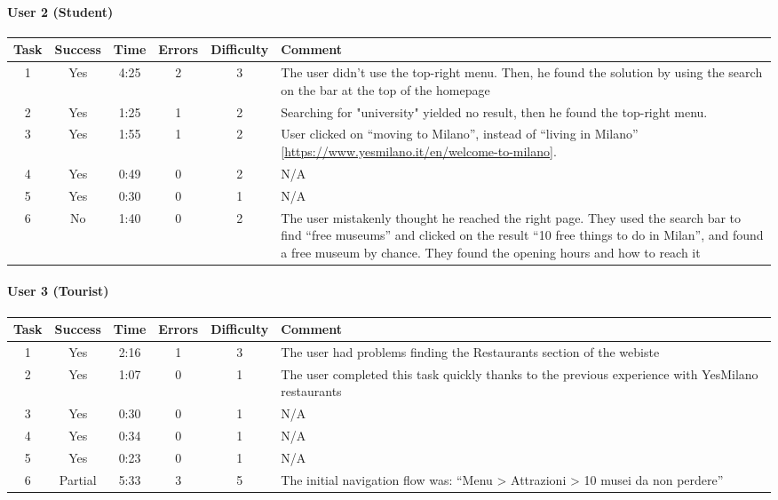 \begin{small}
\paragraph{User 2 (Student)}
\begin{tabularx}{\linewidth}{c c c c c X}
    \toprule
    \textbf{Task} & \textbf{Success} & \textbf{Time}
     & \textbf{Errors} & \textbf{Difficulty} & \textbf{Comment} \\
    \midrule
    1 & Yes & 4:25 & 2 & 3 & The user didn't use the top-right menu. Then, he found the solution by using the search on the bar at the top of the homepage \\ \midrule
    2 & Yes & 1:25 & 1 & 2 & Searching for "university" yielded no result, then he found the top-right menu. \\ \midrule
    3 & Yes & 1:55 & 1 & 2 & User clicked on ``moving to Milano'', instead of ``living in Milano'' [\href{https://www.yesmilano.it/en/welcome-to-milano}{https://www.yesmilano.it/en/welcome-to-milano}]. \\ \midrule
    4 & Yes & 0:49 & 0 & 2 & N/A \\ \midrule
    5 & Yes & 0:30 & 0 & 1 & N/A \\ \midrule
    6 & No & 1:40 & 0 & 2 & The user mistakenly thought he reached the right page. They used the search bar to find ``free museums'' and clicked on the result ``10 free things to do in Milan'', and found a free museum by chance. They found the opening hours and how to reach it \\ \bottomrule
\end{tabularx}

\paragraph{User 3 (Tourist)}
\begin{tabularx}{\linewidth}{c c c c c X}
    \toprule
    \textbf{Task} & \textbf{Success} & \textbf{Time}
     & \textbf{Errors} & \textbf{Difficulty} & \textbf{Comment} \\
    \midrule
    1 & Yes & 2:16 & 1 & 3 & The user had problems finding the Restaurants section of the webiste \\ \midrule
    2 & Yes & 1:07 & 0 & 1 & The user completed this task quickly thanks to the previous experience with YesMilano restaurants \\ \midrule
    3 & Yes & 0:30 & 0 & 1 & N/A \\ \midrule
    4 & Yes & 0:34 & 0 & 1 & N/A \\ \midrule
    5 & Yes & 0:23 & 0 & 1 & N/A \\ \midrule
    6 & Partial & 5:33 & 3 & 5 & The initial navigation flow was: ``Menu > Attrazioni > 10 musei da non perdere'' \\ \bottomrule
\end{tabularx}


\end{small}
